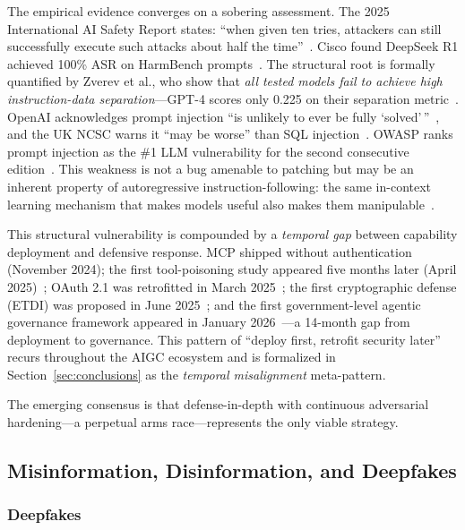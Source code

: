 The empirical evidence converges on a sobering assessment. The 2025 International AI Safety Report states: ``when given ten tries, attackers can still successfully execute such attacks about half the time''~\cite{aisafetyreport2025}. Cisco found DeepSeek R1 achieved 100\% ASR on HarmBench prompts~\cite{cisco2025deepseek}. The structural root is formally quantified by Zverev et al., who show that \emph{all tested models fail to achieve high instruction-data separation}---GPT-4 scores only 0.225 on their separation metric~\cite{zverev2025separation}. OpenAI acknowledges prompt injection ``is unlikely to ever be fully `solved'\,''~\cite{openai2025atlas}, and the UK NCSC warns it ``may be worse'' than SQL injection~\cite{ncsc2025promptinjection}. OWASP ranks prompt injection as the \#1 LLM vulnerability for the second consecutive edition~\cite{owasp2025}. This weakness is not a bug amenable to patching but may be an inherent property of autoregressive instruction-following: the same in-context learning mechanism that makes models useful also makes them manipulable~\cite{zverev2025separation}.

This structural vulnerability is compounded by a \emph{temporal gap} between capability deployment and defensive response. MCP shipped without authentication (November 2024); the first tool-poisoning study appeared five months later (April 2025)~\cite{invariant2025toolpoisoning}; OAuth 2.1 was retrofitted in March 2025~\cite{mcpspec2025}; the first cryptographic defense (ETDI) was proposed in June 2025~\cite{bhatt2025etdi}; and the first government-level agentic governance framework appeared in January 2026~\cite{imda2026agentic}---a 14-month gap from deployment to governance. This pattern of ``deploy first, retrofit security later'' recurs throughout the AIGC ecosystem and is formalized in Section~\ref{sec:conclusions} as the \emph{temporal misalignment} meta-pattern.

The emerging consensus is that defense-in-depth with continuous adversarial hardening---a perpetual arms race---represents the only viable strategy.


\subsection{Misinformation, Disinformation, and Deepfakes}
\label{sec:threat-misinfo}

\subsubsection{Deepfakes}
\label{sec:threat-deepfake}

